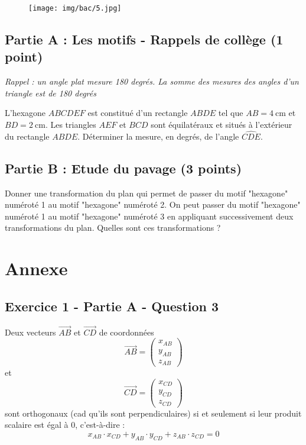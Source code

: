 \documentclass[answers]{exam}
\begin{document}
\begin{figure}[H]
  \centering
  \texttt{[image: img/bac/5.jpg]}
\end{figure}

\subsection*{Partie A : Les motifs - Rappels de collège (1 point)}

\textit{Rappel : un angle plat mesure 180 degrés. La somme des mesures des angles d'un triangle est de 180 degrés}

\begin{questions}
  \question[1] L'hexagone $ABCDEF$ est constitué d’un rectangle $ABDE$ tel que $AB=\SI{4}{\centi\metre}$ et $BD=\SI{2}{\centi\metre}$.
  Les triangles $AEF$ et $BCD$ sont équilatéraux et situés à l’extérieur du rectangle $ABDE$. Déterminer la mesure, en degrés, de l’angle $\widehat{CDE}$.
\end{questions}

\subsection*{Partie B : Etude du pavage (3 points)}

\begin{questions}
  \question[1] Donner une transformation du plan qui permet de passer du motif "hexagone" numéroté 1 au motif "hexagone" numéroté 2.
  \question[2] On peut passer du motif "hexagone" numéroté 1 au motif "hexagone" numéroté 3 en appliquant successivement deux transformations du plan. Quelles sont ces transformations ?
\end{questions}


\section*{Annexe}

\subsection*{Exercice 1 - Partie A - Question 3}

Deux vecteurs $\overrightarrow{AB}$ et $\overrightarrow{CD}$ de coordonnées \\ 

\[
  \overrightarrow{AB} = 
  \begin{pmatrix}
    x_{AB} \\
    y_{AB} \\ 
    z_{AB}
  \end{pmatrix}
\] et
\[
  \overrightarrow{CD} = 
  \begin{pmatrix}
    x_{CD} \\
    y_{CD} \\ 
    z_{CD}
  \end{pmatrix}
\]
sont orthogonaux (cad qu'ils sont perpendiculaires) si et seulement si leur produit scalaire est égal à 0, c'est-à-dire : 
\[
  x_{AB} \cdot x_{CD} + y_{AB} \cdot y_{CD} + z_{AB} \cdot z_{CD} = 0
\]
\end{document}
